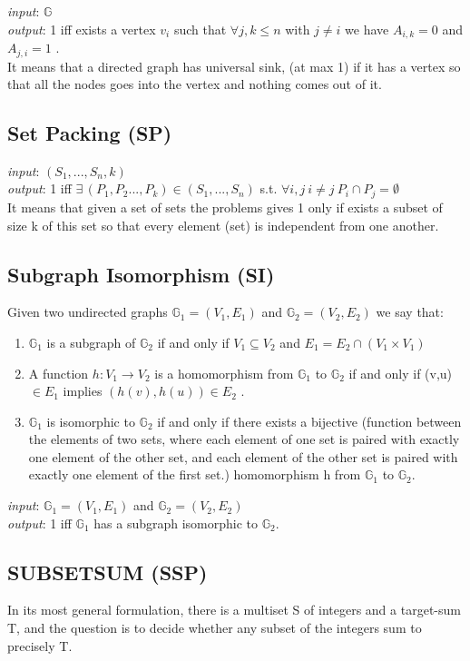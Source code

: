 \emph{input}: $\mathbb{G}$\\
\emph{output}: 1 iff exists a vertex \(v_i\) such that \(\forall j,k \leq n\) with \(j \neq i\) we have \(A_{i,k}=0\) and \(A_{j,i}=1\) .\\
It means that a directed graph has universal sink, (at max 1) if it has a vertex so that all the nodes goes into the vertex and nothing comes out of it.

\subsection{Set Packing (SP)}
\emph{input}: $(S_1,...,S_n,k)$\\
\emph{output}: 1 iff \(\exists  \, (P_1,P_2...,P_k) \in (S_1,...,S_n) \) s.t. \(\forall i,j \ i\neq j\ P_i \cap P_j = \emptyset\)  \\
It means that given a set of sets the problems gives 1 only if exists a subset of size k of this set so that every element (set) is independent from one another.

\subsection{Subgraph Isomorphism (SI)}
Given two undirected graphs \(\mathbb{G}_1 = (V_1,E_1)\) and \(\mathbb{G}_2 = (V_2,E_2)\) we say that:
\begin{enumerate}
	\item \(\mathbb{G}_1\) is a subgraph of \(\mathbb{G}_2\) if and only if \(V_1 \subseteq V_2\) and \(E_1 = E_2 \cap (V_1 \times V_1)\)
	\item A function \(h: V_1 \rightarrow V_2\) is a homomorphism from \(\mathbb{G}_1\) to \(\mathbb{G}_2\) if and only if (v,u)\( \in E_1\) implies \((h(v),h(u)) \in E_2\) .
	\item \(\mathbb{G}_1\) is isomorphic to \(\mathbb{G}_2\) if and only if there exists a bijective (function between the elements of two sets, where each element of one set is paired with exactly one element of the other set, and each element of the other set is paired with exactly one element of the first set.) homomorphism h from \(\mathbb{G}_1\) to \(\mathbb{G}_2\).
\end{enumerate}

\emph{input}: $\mathbb{G}_1 = (V_1,E_1)$ and $\mathbb{G}_2 = (V_2,E_2)$\\
\emph{output}: 1 iff $\mathbb{G}_1$ has a subgraph isomorphic to $\mathbb{G}_2$.

\subsection{SUBSETSUM (SSP)}
In its most general formulation, there is a multiset S of integers and a target-sum T, and the question is to decide whether any subset of the integers sum to precisely T.

